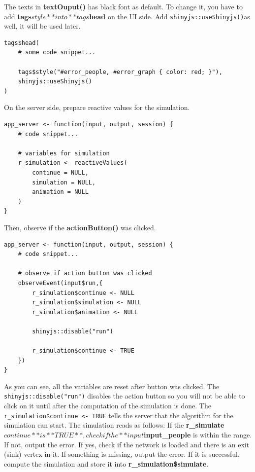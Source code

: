 \documentclass[
]{article}
\begin{document}
The texts in \textbf{textOuput()} has black font as default. To change
it, you have to add \textbf{tags\(style** into **tags\)head} on the UI
side. Add \texttt{shinyjs::useShinyjs()}as well, it will be used later.

\begin{verbatim}
tags$head(
    # some code snippet...

    tags$style("#error_people, #error_graph { color: red; }"),
    shinyjs::useShinyjs()
)
\end{verbatim}

On the server side, prepare reactive values for the simulation.

\begin{verbatim}
app_server <- function(input, output, session) {
    # code snippet...

    # variables for simulation
    r_simulation <- reactiveValues(
        continue = NULL,
        simulation = NULL,
        animation = NULL
    )
}
\end{verbatim}

Then, observe if the \textbf{actionButton()} was clicked.

\begin{verbatim}
app_server <- function(input, output, session) {
    # code snippet...

    # observe if action button was clicked
    observeEvent(input$run,{
        r_simulation$continue <- NULL
        r_simulation$simulation <- NULL
        r_simulation$animation <- NULL
    
        shinyjs::disable("run")
    
        r_simulation$continue <- TRUE
    })
}
\end{verbatim}

As you can see, all the variables are reset after button was clicked.
The \texttt{shinyjs::disable("run")} disables the action button so you
will not be able to click on it until after the computation of the
simulation is done. The
\texttt{r\_simulation\$continue\ \textless{}-\ TRUE} tells the server
that the algorithm for the simulation can start. The simulation reads as
follows: If the
\textbf{r\_simulate\(continue** is **TRUE**, check if the **input\)input\_people}
is within the range. If not, output the error. If yes, check if the
network is loaded and there is an exit (sink) vertex in it. If something
is missing, output the error. If it is successful, compute the
simulation and store it into \textbf{r\_simulation\$simulate}.
\end{document}
